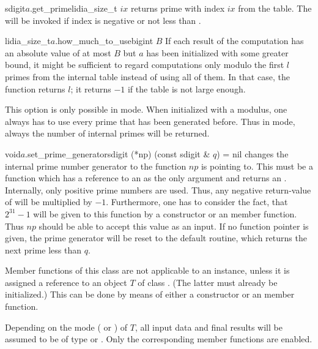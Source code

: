 \begin{cfcode}{sdigit}{$a$.get_prime}{lidia_size_t $ix$}
  returns prime with index $ix$ from the table.  The \LEH will be invoked if index is negative
  or not less than .
\end{cfcode}

\begin{cfcode}{lidia_size_t}{$a$.how_much_to_use}{bigint $B$}
  If each result of the computation has an absolute value of at most $B$ but $a$ has been
  initialized with some greater bound, it might be sufficient to regard computations only modulo
  the first $l$ primes from the internal table instead of using all of them.  In that case, the
  function returns $l$; it returns $-1$ if the table is not large enough.
  
  This option is only possible in  mode.  When initialized with a modulus, one
  always has to use every prime that has been generated before.  Thus in  mode,
  always the number of internal primes will be returned.
\end{cfcode}

\begin{fcode}{void}{$a$.set_prime_generator}{sdigit (*np) (const sdigit & $q$) = nil}
  changes the internal prime number generator to the function $np$ is pointing to.  This must be
  a function which has a  reference to an  as the only argument and
  returns an .  Internally, only positive prime numbers are used.  Thus, any
  negative return-value of  will be multiplied by $-1$.  Furthermore, one has to
  consider the fact, that $2^{31}-1$ will be given to this function by a constructor or an
   member function.  Thus $np$ should be able to accept this value as an input.  If
  no function pointer is given, the prime generator will be reset to the default routine, which
  returns the next prime less than $q$.
\end{fcode}




Member functions of this class are not applicable to an instance, unless it is assigned a
reference to an object $T$ of class .  (The latter must already be initialized.)
This can be done by means of either a constructor or an  member function.

Depending on the mode ( or ) of $T$, all input data and final
results will be assumed to be of type  or .  Only the corresponding
member functions are enabled.


